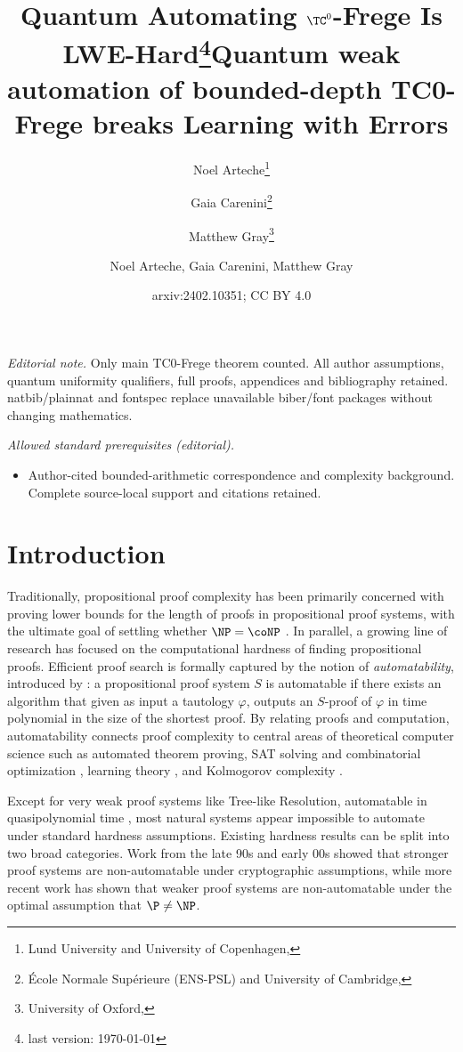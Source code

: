 \documentclass[11pt]{article}
\title{Quantum Automating $\TC^0$-Frege Is LWE-Hard\footnote{last version: \today}}
\date{}
\author{
    Noel Arteche\footnote{Lund University and University of Copenhagen, \email{noel.arteche@cs.lth.se}} \and
    Gaia Carenini\footnote{École Normale Supérieure (ENS-PSL) and University of Cambridge, \email{gaia.carenini@ens.psl.eu}} \and
    Matthew Gray\footnote{University of Oxford, \email{matthew.gray@cs.ox.ac.uk}}
}
\title{Quantum weak automation of bounded-depth TC0-Frege breaks Learning with Errors}
\author{Noel Arteche, Gaia Carenini, Matthew Gray}
\date{arxiv:2402.10351; CC BY 4.0}
\theoremstyle{definition}
\theoremstyle{plain}
\theoremstyle{remark}
\begin{document}
\maketitle
\noindent\textit{Editorial note.} Only main TC0-Frege theorem counted. All author assumptions, quantum uniformity qualifiers, full proofs, appendices and bibliography retained. natbib/plainnat and fontspec replace unavailable biber/font packages without changing mathematics.\par\medskip
\noindent\textit{Allowed standard prerequisites (editorial).}\begin{itemize}
\item Author-cited bounded-arithmetic correspondence and complexity background. Complete source-local support and citations retained.
\end{itemize}\medskip
\section{Introduction}
\label{sec:intro}
Traditionally, propositional proof complexity has been primarily concerned with proving lower bounds for the length of proofs in propositional proof systems, with the ultimate goal of settling whether $\NP = \coNP$ \cite{cookReckhow}. In parallel, a growing line of research has focused on the computational hardness of finding propositional proofs. Efficient proof search is formally captured by the notion of \emph{automatability}, introduced by \citeauthor{BPR1997} \cite{BPR1997}: a propositional proof system $S$ is automatable if there exists an algorithm that given as input a tautology $\varphi$, outputs an $S$-proof of $\varphi$ in time polynomial in the size of the shortest proof. By relating proofs and computation, automatability connects proof complexity to central areas of theoretical computer science such as automated theorem proving, SAT solving and combinatorial optimization \cite{jakob}, learning theory \cite{AleknovichLearning, pichLearning}, and Kolmogorov complexity \cite{krajicekKolmo}.

Except for very weak proof systems like Tree-like Resolution, automatable in quasipolynomial time \cite{BP96}, most natural systems appear impossible to automate under standard hardness assumptions. Existing hardness results can be split into two broad categories. Work from the late 90s and early 00s showed that stronger proof systems are non-automatable under cryptographic assumptions, while more recent work has shown that weaker proof systems are non-automatable under the optimal assumption that $\P \neq \NP$.
\end{document}
